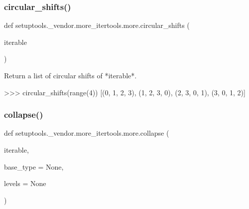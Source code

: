 \subsubsection{\texorpdfstring{circular\+\_\+shifts()}{circular\_shifts()}}
{\footnotesize\ttfamily def setuptools.\+\_\+vendor.\+more\+\_\+itertools.\+more.\+circular\+\_\+shifts (\begin{DoxyParamCaption}\item[{}]{iterable }\end{DoxyParamCaption})}

\begin{DoxyVerb}Return a list of circular shifts of *iterable*.

>>> circular_shifts(range(4))
[(0, 1, 2, 3), (1, 2, 3, 0), (2, 3, 0, 1), (3, 0, 1, 2)]
\end{DoxyVerb}
 \mbox{\label{namespacesetuptools_1_1__vendor_1_1more__itertools_1_1more_a1f9b9d669e72d8284ed1d55eb3d6c730}} 
\subsubsection{\texorpdfstring{collapse()}{collapse()}}
{\footnotesize\ttfamily def setuptools.\+\_\+vendor.\+more\+\_\+itertools.\+more.\+collapse (\begin{DoxyParamCaption}\item[{}]{iterable,  }\item[{}]{base\+\_\+type = {\ttfamily None},  }\item[{}]{levels = {\ttfamily None} }\end{DoxyParamCaption})}

